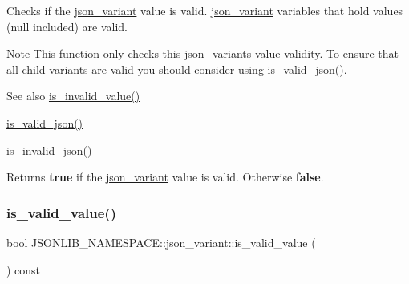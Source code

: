 Checks if the \hyperlink{classJSONLIB__NAMESPACE_1_1json__variant}{json\+\_\+variant} value is valid. \hyperlink{classJSONLIB__NAMESPACE_1_1json__variant}{json\+\_\+variant} variables that hold values (null included) are valid. 

\begin{DoxyNote}{Note}
This function only checks this json\+\_\+variants value validity. To ensure that all child variants are valid you should consider using \hyperlink{classJSONLIB__NAMESPACE_1_1json__variant_a158e3148d9256af3d1b8251b2ca7b6c4}{is\+\_\+valid\+\_\+json()}. 
\end{DoxyNote}
\begin{DoxySeeAlso}{See also}
\hyperlink{classJSONLIB__NAMESPACE_1_1json__variant_ab6552a5e3de90ab1fbca078e5c245bfb}{is\+\_\+invalid\+\_\+value()} 

\hyperlink{classJSONLIB__NAMESPACE_1_1json__variant_a158e3148d9256af3d1b8251b2ca7b6c4}{is\+\_\+valid\+\_\+json()} 

\hyperlink{classJSONLIB__NAMESPACE_1_1json__variant_a1a08b35da4cf3a334d32ebb81b20c08a}{is\+\_\+invalid\+\_\+json()} 
\end{DoxySeeAlso}
\begin{DoxyReturn}{Returns}
{\bfseries true} if the \hyperlink{classJSONLIB__NAMESPACE_1_1json__variant}{json\+\_\+variant} value is valid. Otherwise {\bfseries false}. 
\end{DoxyReturn}
\mbox{\label{classJSONLIB__NAMESPACE_1_1json__variant_a224aab2dd56e3928dd893be8b7f3367a}} 
\subsubsection{\texorpdfstring{is\+\_\+valid\+\_\+value()}{is\_valid\_value()}\hspace{0.1cm}{\footnotesize\ttfamily [2/2]}}
{\footnotesize\ttfamily bool J\+S\+O\+N\+L\+I\+B\+\_\+\+N\+A\+M\+E\+S\+P\+A\+C\+E\+::json\+\_\+variant\+::is\+\_\+valid\+\_\+value (\begin{DoxyParamCaption}{ }\end{DoxyParamCaption}) const}



